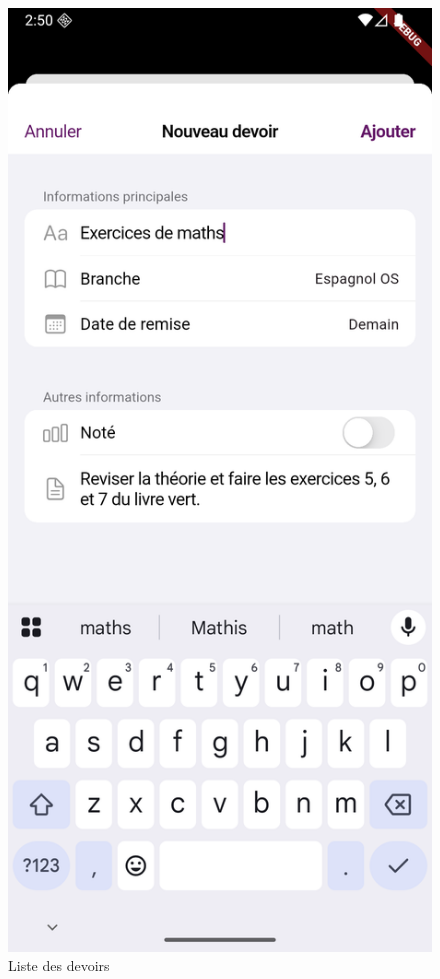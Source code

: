 \documentclass[12pt]{report}
\begin{document}
\begin{itemize}
\begin{figure}[H]
\begin{minipage}[t]{0.32\textwidth}
			\caption*{Liste des devoirs}
		\end{minipage}
		\hfill
		\begin{minipage}[t]{0.32\textwidth}
			\centering
			\includegraphics[width=\textwidth]{img/new_homework.png}

\end{minipage}
\end{figure}
\end{itemize}
\end{document}
